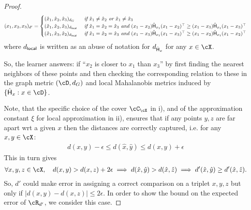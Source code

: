 \begin{proof}
    \begin{align}\label{eq: approxmetric}
        (x_1,x_2,x_3)_{d'} = \begin{cases}
            (\hat{x}_1,\hat{x}_2,\hat{x}_3)_{d_G} & \textit{ if } 
            \hat{x}_1 \neq \hat{x}_2 \textit{ or } \hat{x}_1 \neq \hat{x}_3\\
            (\hat{x}_1,\hat{x}_2,\hat{x}_3)_{d_{\sf{local}}}  & \textit{ if }   \hat{x}_1 = \hat{x}_2 = \hat{x}_3       \textit{ and } ({x}_1 -  {x}_2) \hat{\sf{H}}_{x_1}({x}_1 -  {x}_2)^{\top} \ge ({x}_1 -  {x}_3) \hat{\sf{H}}_{x_1}({x}_1 -  {x}_3)^{\top}\\
            (\hat{x}_1,\Hat{x}_3,\hat{x}_2)_{d_{\sf{local}}}  & \textit{ if }   \hat{x}_1 = \hat{x}_2 = \hat{x}_3       \textit{ and } ({x}_1 -  {x}_3) \hat{\sf{H}}_{x_1}({x}_1 -  {x}_3)^{\top}  \ge   ({x}_1 -  {x}_2) \hat{\sf{H}}_{x_1}({x}_1 -  {x}_2)^{\top}
        \end{cases}
    \end{align}
    where $d_{\sf{local}}$ is written as an abuse of notation for $d_{\hat{\sf{H}}_x}$ for any $x \in \cX$. 
    
     So, the learner answers: if ``$x_2$ is closer to $x_1$ than $x_3$'' by first finding the nearest neighbors of these points and then checking the corresponding relation to these in the graph metric $(\cD, d_G)$ and local Mahalanobis metrics induced by $\{\hat{\sf{H}}_x: x \in \cD\}$.

    Note, that the specific choice of the cover $\cC_{\cX}$ in i), and of the approximation constant $\xi$ for local approximation in ii), ensures that if any points $y,z$ are far apart wrt a given $x$ then the distances are correctly captured, i.e. for any $x,y \in \cX$:
    \begin{align}
        d(x,y) - \epsilon \le d(\hat{x}, \hat{y}) \le  d(x,y) + \epsilon \label{eq: apdist}
    \end{align}
    This in turn gives
    \begin{align*}
      \forall x,y,z \in \cX,\quad  d(x,y) > d(x,z) + 2\epsilon \implies d(\hat{x},\hat{y}) > d(\hat{x},\hat{z}) \implies d'(\hat{x},\hat{y}) \ge d'(\hat{x},\hat{z}).
    \end{align*}
     So, $d'$ could make error in assigning a correct comparison on a triplet $x,y,z$ but only if $|d(x,y) - d(x,z)| \le 2\epsilon$. In order to show the bound on the expected error of $\cR_{d'}$, we consider this case.
    

\end{proof}
